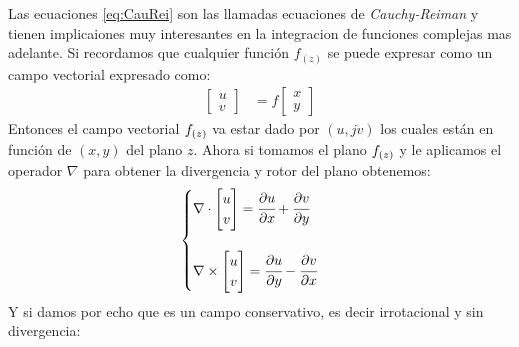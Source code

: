 Las ecuaciones \ref{eq:CauRei} son las llamadas ecuaciones de \textit{Cauchy-Reiman} y tienen implicaiones muy interesantes en la integracion de funciones complejas mas adelante. Si recordamos que cualquier función $f_{(z)}$ se puede expresar como un campo vectorial expresado como:
\begin{equation}
     \begin{aligned}
         \begin{bmatrix}
           u \\
           v 
         \end{bmatrix} &= f\begin{bmatrix}
           x \\
           y 
         \end{bmatrix} 
     \end{aligned}
\end{equation}
Entonces el campo vectorial $f_{(z)}$ va estar dado por $(u,jv)$ los cuales están en función de $(x,y)$ del plano $z$.
Ahora si tomamos el plano $f_{(z)}$ y le aplicamos el operador $\nabla$ para obtener la divergencia y rotor del plano obtenemos:
\begin{equation}
    \begin{cases}
        \begin{aligned}
            \nabla & \cdot \begin{bmatrix}
                u \\
                v
            \end{bmatrix}
            =\cfrac{\partial u}{\partial x}+\cfrac{\partial v}{\partial y}
        \end{aligned}\\
        \\
        \begin{aligned}
             \nabla \times  \begin{bmatrix}
                u \\
                v
            \end{bmatrix}
            =\cfrac{\partial u}{\partial y}-\cfrac{\partial v}{\partial x}
            \end{aligned}
        \end{cases}
\end{equation}
Y si damos por echo que es un campo conservativo, es decir irrotacional y sin divergencia:
